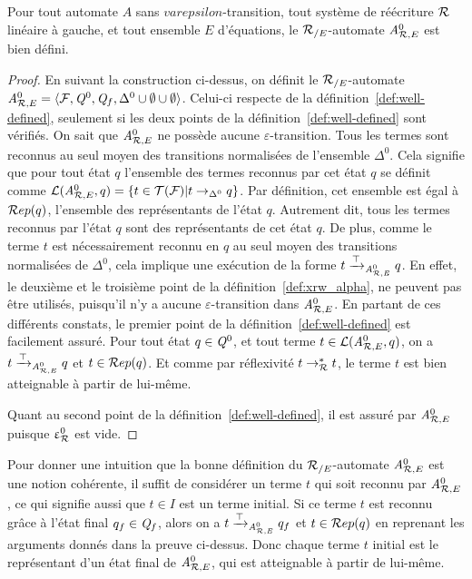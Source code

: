 \begin{theorem}
  Pour tout automate $A$ sans $varepsilon$-transition, tout système de réécriture $\mathcal R$
  linéaire à gauche, et tout ensemble $E$ d'équations, le ${\mathcal R_{/E}}$-automate ${\mathit A}_{\mathcal R,E}^0$ est bien défini.
\end{theorem}

\begin{proof}
  En suivant la construction ci-dessus, on définit le ${\mathcal R_{/E}}$-automate
  ${\mathit A}_{\mathcal R,E}^0 = \langle \mathcal{F}, \mathit Q^0, \mathit Q_f, \Delta^0 \cup \emptyset \cup \emptyset\rangle$.
  Celui-ci respecte de la définition~\ref{def:well-defined}, seulement si les deux points
  de la définition~\ref{def:well-defined} sont vérifiés.
  \noindent
  On sait que ${\mathit A}_{\mathcal R,E}^0$ ne possède aucune $\varepsilon$-transition.
  Tous les termes sont reconnus au seul moyen des transitions normalisées de l'ensemble $\Delta^0$.
  Cela signifie que pour tout état $q$ l'ensemble des termes reconnus par cet état $q$ 
  se définit comme $\mathcal{L}({\mathit A}_{\mathcal R,E}^0, q) = \{ t \in \mathcal{T(F)} | t \rightarrow_{\Delta^0} q\}$. Par définition,
  cet ensemble est égal à $\mathcal R ep(q)$, l'ensemble des représentants de l'état $q$. Autrement dit,
  tous les termes reconnus par l'état $q$ sont des représentants de cet état $q$.
  De plus, comme le terme $t$ est nécessairement reconnu en $q$ au seul moyen des transitions normalisées de $\Delta^0$,
  cela implique une exécution de la forme $t \xrightarrow{\top}_{{\mathit A}_{\mathcal R,E}^0} q$. En effet, le deuxième et le troisième point de la
  définition~\ref{def:xrw_alpha}, ne peuvent pas être utilisés, puisqu'il
  n'y a aucune $\varepsilon$-transition dans ${\mathit A}_{\mathcal R,E}^0$.
  En partant de ces différents constats, le premier point de la définition~\ref{def:well-defined} est facilement assuré.
  Pour tout état $q \in \mathit Q^0$, et tout terme $t \in \mathcal{L}({\mathit A}_{\mathcal R,E}^0, q)$, on a $t \xrightarrow{\top}_{{\mathit A}_{\mathcal R,E}^0} q$ et $t \in \mathcal R ep(q)$. 
  Et comme par réflexivité $t \rightarrow_\mathcal R^* t$, le terme $t$ est bien atteignable à partir de lui-même.
  
  Quant au second point de la définition~\ref{def:well-defined}, il est assuré par ${\mathit A}_{\mathcal R,E}^0$ puisque $\upvarepsilon_{\mathcal R}^0$ est vide.
\end{proof}

Pour donner une intuition que la bonne définition du ${\mathcal R_{/E}}$-automate ${\mathit A}_{\mathcal R,E}^0$ est une notion cohérente, il 
suffit de considérer un terme $t$ qui soit reconnu par ${\mathit A}_{\mathcal R,E}^0$, ce qui signifie aussi que $t \in I$
est un terme initial. Si ce terme $t$ est reconnu grâce à l'état final $q_f \in \mathit Q_f$,
alors on a $t \xrightarrow{\top}_{{\mathit A}_{\mathcal R,E}^0} q_f$ et $t \in \mathcal R ep(q)$ en reprenant les arguments donnés dans la preuve ci-dessus.
Donc chaque terme $t$ initial est le représentant d'un état final de ${\mathit A}_{\mathcal R,E}^0$, qui est atteignable à partir de 
lui-même.

